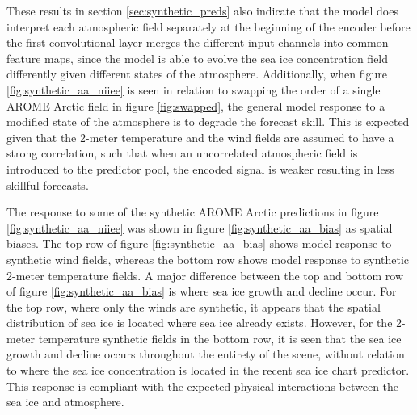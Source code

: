 \documentclass[../main/thesis]{subfiles}
\begin{document}
These results in section \ref{sec:synthetic_preds} also indicate that the model does interpret each atmospheric field separately at the beginning of the encoder before the first convolutional layer merges the different input channels into common feature maps, since the model is able to evolve the sea ice concentration field differently given different states of the atmosphere. Additionally, when figure \ref{fig:synthetic_aa_niiee} is seen in relation to swapping the order of a single AROME Arctic field in figure \ref{fig:swapped}, the general model response to a modified state of the atmosphere is to degrade the forecast skill. This is expected given that the 2-meter temperature and the wind fields are assumed to have a strong correlation, such that when an uncorrelated atmospheric field is introduced to the predictor pool, the encoded signal is weaker resulting in less skillful forecasts.

The response to some of the synthetic AROME Arctic predictions in figure \ref{fig:synthetic_aa_niiee} was shown in figure \ref{fig:synthetic_aa_bias} as spatial biases. The top row of figure \ref{fig:synthetic_aa_bias} shows model response to synthetic wind fields, whereas the bottom row shows model response to synthetic 2-meter temperature fields. A major difference between the top and bottom row of figure \ref{fig:synthetic_aa_bias} is where sea ice growth and decline occur. For the top row, where only the winds are synthetic, it appears that the spatial distribution of sea ice is located where sea ice already exists. However, for the 2-meter temperature synthetic fields in the bottom row, it is seen that the sea ice growth and decline occurs throughout the entirety of the scene, without relation to where the sea ice concentration is located in the recent sea ice chart predictor. This response is compliant with the expected physical interactions between the sea ice and atmosphere. 
\end{document}
